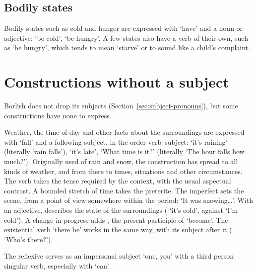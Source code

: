\subsection{Bodily states}
Bodily states such as cold and hunger are expressed with  `have' and a noun or adjective:  `be cold',  `be hungry'. A few states also have a verb of their own, such as  `be hungry', which tends to mean `starve' or to sound like a child's complaint.

\section{Constructions without a subject}\label{sec:impersonal}
Borlish does not drop its subjects (Section~\ref{sec:subject-pronouns}), but some constructions have none to express.

Weather, the time of day and other facts about the surroundings are expressed with  `fall' and a following subject, in the order verb--subject:  `it's raining' (literally `rain falls'),  `it's late',  `What time is it?' (literally `The hour falls how much?'). Originally used of rain and snow, the construction has spread to all kinds of weather, and from there to times, situations and other circumstances. The verb takes the tense required by the context, with the usual aspectual contrast. A bounded stretch of time takes the preterite. The imperfect sets the scene, from a point of view somewhere within the period:  `It was snowing\ldots'.
With an adjective,  describes the state of the surroundings ( `it's cold', against  `I'm cold'). A change in progress adds , the present participle of  `become'.
The existential verb  `there be' works in the same way, with its subject after it ( `Who's there?').

The reflexive  serves as an impersonal subject `one, you' with a third person singular verb, especially with  `can'.

